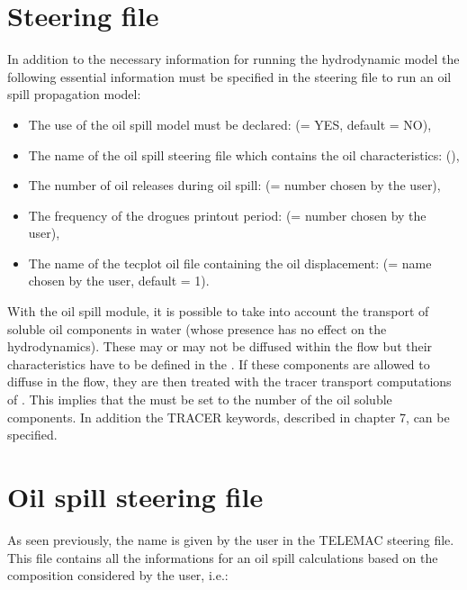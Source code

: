 \section{Steering file}

In addition to the necessary information for running the 
hydrodynamic model the following essential information must be specified in the
 steering file to run an oil spill propagation model:

\begin{itemize}
\item The use of the oil spill model must be declared: 
(= YES, default = NO),

\item The name of the oil spill steering file which contains the oil
characteristics:  (),

\item The number of oil releases during oil spill:  (= number chosen by the user),

\item The frequency of the drogues printout period:  (= number chosen by the user),

\item The name of the tecplot oil file containing the oil displacement:
 (= name chosen by the user, default = 1).
\end{itemize}

With the oil spill module, it is possible to take into account the transport of
soluble oil components in water (whose presence has no effect on the
hydrodynamics). These may or may not be diffused within the flow but their
characteristics have to be defined in the . If
these components are allowed to diffuse in the flow, they are then treated with
the tracer transport computations of . This implies that the
 must be set to the number of the oil soluble
components. In addition the TRACER keywords, described in chapter 7, can be
specified.


\section{Oil spill steering file}

As seen previously, the  name is given by the
user in the TELEMAC steering file. This file contains all the informations for
an oil spill calculations based on the composition considered by the user,
i.e.:

